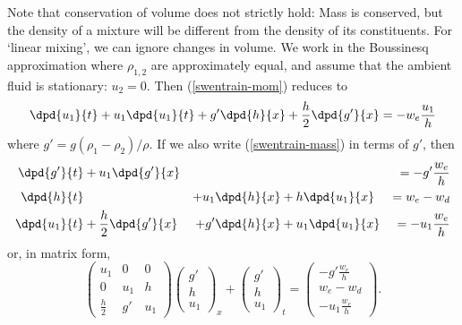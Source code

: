 Note that conservation of volume does not strictly hold: Mass is conserved, but the density of a mixture will be different from the density of its constituents. For `linear mixing', we can ignore changes in volume. We work in the Boussinesq approximation where $\rho_{1,2}$ are approximately equal, and assume that the ambient fluid is stationary: $u_2 = 0$. Then (\ref{swentrain-mom}) reduces to
\begin{equation}
	\dpd{u_1}{t} + u_1\dpd{u_1}{t} + g' \dpd{h}{x} + \frac{h}{2}\dpd{g'}{x}
		 = -w_e \frac{u_1}{h}
\end{equation}
where $g' = g(\rho_1-\rho_2)/\rho$. If we also write (\ref{swentrain-mass}) in terms of $g'$, then 
\begin{alignat}{5}
	\dpd{g'}{t} 		&+ u_1 \dpd{g'}{x}  		&				& 				&= -g'\frac{w_e}{h} \\
	\dpd{h}{t} 		& 					&+ u_1\dpd{h}{x}	&+ h\dpd{u_1}{x} 	&= w_e - w_d \\
	\dpd{u_1}{t} 	&+ \frac{h}{2}\dpd{g'}{x}	&+ g'\dpd{h}{x} 		&+ u_1 \dpd{u_1}{x} 	&= -u_1 \frac{w_e}{h}
\end{alignat}
or, in matrix form,
\begin{equation}
\begin{pmatrix}
 u_1 & 0 & 0 \\
 0 & u_1 & h \\
 \frac{h}{2} & g' & u_1 
\end{pmatrix}
\begin{pmatrix}
g' \\ h \\ u_1
\end{pmatrix} _x + \begin{pmatrix}g'\\h\\u_1\end{pmatrix} _t 
= 
\begin{pmatrix}
 -g'\frac{w_e}{h} \\  w_e - w_d \\  -u_1 \frac{w_e}{h}
\end{pmatrix}.
\label{swentrain-matrix}
\end{equation}

